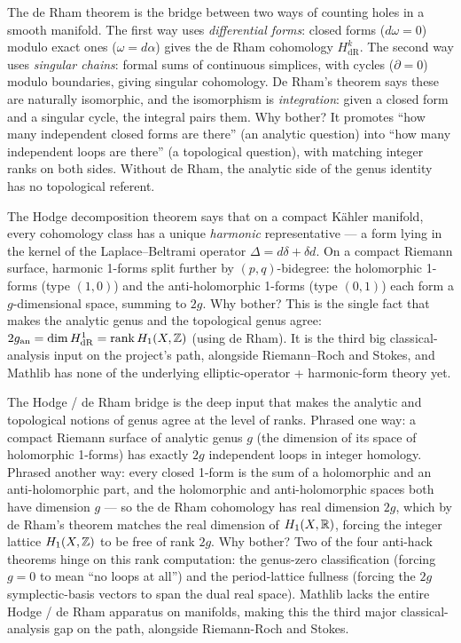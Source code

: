 \begin{layman}
The de Rham theorem is the bridge between two ways of counting
holes in a smooth manifold. The first way uses
\emph{differential forms}: closed forms (\(d\omega = 0\)) modulo
exact ones (\(\omega = d\alpha\)) gives the de Rham cohomology
\(H^k_{\mathrm{dR}}\). The second way uses \emph{singular chains}:
formal sums of continuous simplices, with cycles (\(\partial = 0\))
modulo boundaries, giving singular cohomology. De Rham's theorem
says these are naturally isomorphic, and the isomorphism is
\emph{integration}: given a closed form and a singular cycle, the
integral pairs them. Why bother? It promotes ``how many independent
closed forms are there'' (an analytic question) into ``how many
independent loops are there'' (a topological question), with
matching integer ranks on both sides. Without de Rham, the
analytic side of the genus identity has no topological referent.
\end{layman}



\begin{layman}
The Hodge decomposition theorem says that on a compact K\"ahler
manifold, every cohomology class has a unique \emph{harmonic}
representative --- a form lying in the kernel of the
Laplace--Beltrami operator \(\Delta = d\delta + \delta d\). On a
compact Riemann surface, harmonic 1-forms split further by
\((p,q)\)-bidegree: the holomorphic 1-forms (type \((1,0)\)) and
the anti-holomorphic 1-forms (type \((0,1)\)) each form a
\(g\)-dimensional space, summing to \(2g\). Why bother? This is
the single fact that makes the analytic genus and the topological
genus agree: \(2g_{\mathrm{an}} = \dim H^1_{\mathrm{dR}} =
\mathrm{rank}\, H_1(X,\mathbb{Z})\) (using de Rham). It is the third
big classical-analysis input on the project's path, alongside
Riemann--Roch and Stokes, and Mathlib has none of the underlying
elliptic-operator + harmonic-form theory yet.
\end{layman}



\begin{layman}
The Hodge / de Rham bridge is the deep input that makes the
analytic and topological notions of genus agree at the level of
ranks. Phrased one way: a compact Riemann surface of analytic
genus \(g\) (the dimension of its space of holomorphic 1-forms) has
exactly \(2g\) independent loops in integer homology. Phrased
another way: every closed 1-form is the sum of a holomorphic and
an anti-holomorphic part, and the holomorphic and anti-holomorphic
spaces both have dimension \(g\) --- so the de Rham cohomology has
real dimension \(2g\), which by de Rham's theorem matches the
real dimension of \(H_1(X,\mathbb{R})\), forcing the integer lattice
\(H_1(X,\mathbb{Z})\) to be free of rank \(2g\). Why bother? Two of the
four anti-hack theorems hinge on this rank computation: the
genus-zero classification (forcing \(g=0\) to mean ``no loops at
all'') and the period-lattice fullness (forcing the
\(2g\) symplectic-basis vectors to span the dual real space).
Mathlib lacks the entire Hodge / de Rham apparatus on manifolds,
making this the third major classical-analysis gap on the path,
alongside Riemann-Roch and Stokes.
\end{layman}


